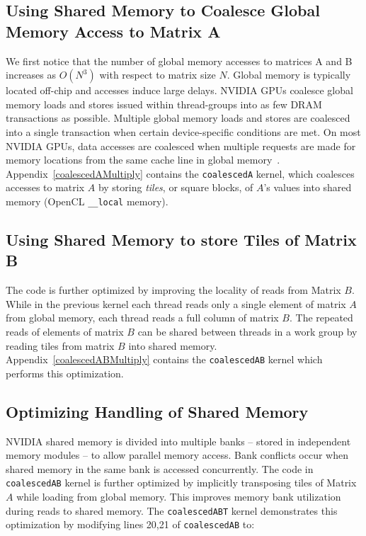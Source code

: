 \documentclass[review=false, sigchi]{acmart}
\begin{document}
	\subsection{Using Shared Memory to Coalesce Global Memory Access to Matrix A} 
	
	We first notice that the number of global memory accesses to matrices A and B increases as $O(N^3)$ with respect to matrix size $N$.
	Global memory is typically located off-chip and accesses induce large delays.
	NVIDIA GPUs coalesce global memory loads and stores issued within thread-groups into as few DRAM transactions as possible.
	Multiple global memory loads and stores are coalesced into a single transaction when certain device-specific conditions are met. 
	On most NVIDIA GPUs, data accesses are coalesced when multiple requests are made for memory locations from the same cache line in global memory~\cite{cudamanual}.
	Appendix~\ref{coalescedAMultiply} contains the \texttt{coalescedA} kernel, which coalesces accesses to matrix $A$ by storing \emph{tiles}, or square blocks, of $A$'s values into shared memory (OpenCL \texttt{\_\_local} memory). 
	
	
	\subsection{Using Shared Memory to store Tiles of Matrix B} 
	
	The code is further optimized by improving the locality of reads from Matrix $B$.
	While in the previous kernel each thread reads only a single element of matrix $A$ from global memory, each thread reads a full column of matrix $B$.
	The repeated reads of elements of matrix $B$ can be shared between threads in a work group by reading tiles from matrix $B$ into shared memory.
	Appendix~\ref{coalescedABMultiply} contains the \texttt{coalescedAB} kernel which performs this optimization.
	
	\subsection{Optimizing Handling of Shared Memory} 
	
	NVIDIA shared memory is divided into multiple banks -- stored in independent memory modules -- to allow parallel memory access.
	Bank conflicts occur when shared memory in the same bank is accessed concurrently.
	The code in \texttt{coalescedAB} kernel is further optimized by implicitly transposing tiles of Matrix $A$ while loading from global memory. This improves memory bank utilization during reads to shared memory. The \texttt{coalescedABT} kernel demonstrates this optimization by modifying lines 20,21 of \texttt{coalescedAB} to:
	
\end{document}
